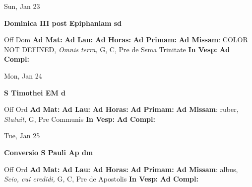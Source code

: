\documentclass[10pt]{memoir}
\begin{document}
\begin{center}
\begin{minipage}{3.5in}
\vspace{2em}
\begin{center}Sun, Jan 23
\end{center}
\textbf{ \large Dominica III post Epiphaniam
\textnormal{\normalsize sd}}

\begin{justify}Off Dom
\textbf{Ad Mat: }
\textbf{Ad Lau: }
\textbf{Ad Horas: }
\textbf{Ad Primam: }\textbf{Ad Missam}: COLOR NOT DEFINED, \textit{Omnis terra,} G, C, Pre de Ssma Trinitate
\textbf{In Vesp: }
\textbf{Ad Compl: }
\end{justify}
\end{minipage}
\end{center}

\begin{center}
\begin{minipage}{3.5in}
\vspace{2em}
\begin{center}Mon, Jan 24
\end{center}
\textbf{ \large S Timothei EM
\textnormal{\normalsize d}}

\begin{justify}Off Ord
\textbf{Ad Mat: }
\textbf{Ad Lau: }
\textbf{Ad Horas: }
\textbf{Ad Primam: }\textbf{Ad Missam}: ruber, \textit{Statuit,} G, Pre Communis
\textbf{In Vesp: }
\textbf{Ad Compl: }
\end{justify}
\end{minipage}
\end{center}

\begin{center}
\begin{minipage}{3.5in}
\vspace{2em}
\begin{center}Tue, Jan 25
\end{center}
\textbf{ \large Conversio S Pauli Ap
\textnormal{\normalsize dm}}

\begin{justify}Off Ord
\textbf{Ad Mat: }
\textbf{Ad Lau: }
\textbf{Ad Horas: }
\textbf{Ad Primam: }\textbf{Ad Missam}: albus, \textit{Scio, cui credidi,} G, C, Pre de Apostolis
\textbf{In Vesp: }
\textbf{Ad Compl: }
\end{justify}
\end{minipage}
\end{center}
\end{document}
